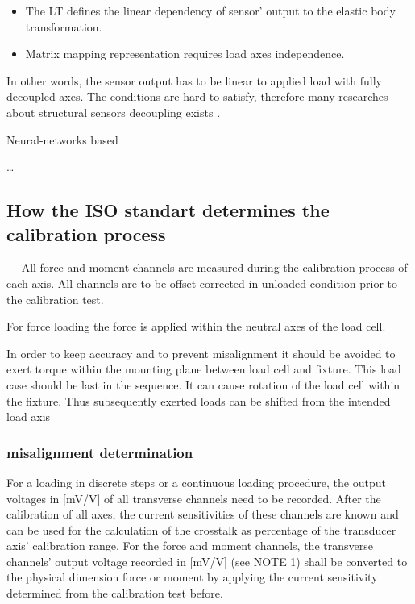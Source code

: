 \begin{itemize}
    \item The LT defines the linear dependency of sensor' output to the elastic body transformation.
    \item Matrix mapping representation requires load axes independence. 
\end{itemize}

In other words, the sensor output has to be linear to applied load with fully decoupled axes. 
The conditions are hard to satisfy, therefore many researches about structural sensors decoupling exists \cite{beam_structure_math,decoupling_sliding_structure,shape_optimization_decoupled,modal_sensor}.

Neural-networks based 

\dots

\subsection{How the ISO standart determines the calibration process}

— All force and moment channels are measured during the calibration process of each axis. All channels
are to be offset corrected in unloaded condition prior to the calibration test.

For force loading the force is applied within the neutral axes of the load cell.

In order to keep accuracy and to prevent  misalignment it should be avoided to exert torque within the mounting plane between load cell and fixture. This load case should be last in the sequence. It can cause rotation of the load cell within the fixture. Thus subsequently exerted loads can be shifted from the intended load axis

\subsubsection{misalignment determination}

For a loading in discrete steps or a continuous loading procedure, the output voltages in [mV/V] of all
transverse channels need to be recorded.
After the calibration of all axes, the current sensitivities of these channels are known and can be used
for the calculation of the crosstalk as percentage of the transducer axis’ calibration range.
For the force and moment channels, the transverse channels’ output voltage recorded in [mV/V]
(see NOTE 1) shall be converted to the physical dimension force or moment by applying the current
sensitivity determined from the calibration test before. 


